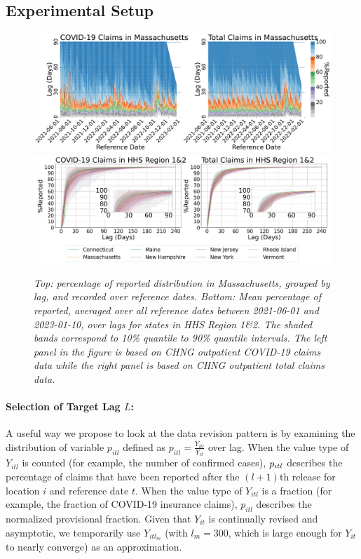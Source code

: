 \subsection{Experimental Setup}
\begin{figure}[h!]
    \centering
    \includegraphics[width=\textwidth]{figs/completeness_Massachusetts.pdf}
    \includegraphics[width=\textwidth]{figs/completeness_lineplot_hhs1&2.pdf}
    \caption{\emph{Top: percentage of reported distribution in Massachusetts, grouped by lag, and recorded over reference dates. Bottom: Mean percentage of reported, averaged over all reference dates between 2021-06-01 and 2023-01-10, over lags for states in HHS Region 1\&2. The shaded bands correspond to 10\% quantile to 90\% quantile intervals. The left panel in the figure is based on CHNG outpatient COVID-19 claims data while the right panel is based on CHNG outpatient total claims data.}}
\end{figure}

\paragraph{Selection of Target Lag $L$:}
A useful way we propose to look at the data revision pattern is by examining the distribution of variable $p_{itl}$ defined as $p_{itl} = \frac{Y_{itl}}{Y_{it}}$
over lag. 
When the value type of $Y_{itl}$ is counted (for example, the number of confirmed cases), $p_{itl} \time 100$ describes the percentage of claims that have been reported after the $(l+1)$th release for location $i$ and reference date $t$. When the value type of $Y_{itl}$ is a fraction (for example, the fraction of COVID-19 insurance claims), $p_{itl}$ describes the normalized provisional fraction. Given that $Y_{it}$ is continually revised and asymptotic, we temporarily use $Y_{itl_m}$ (with $l_m = 300$, which is large enough for $Y_{it}$ to nearly converge) as an approximation. 



